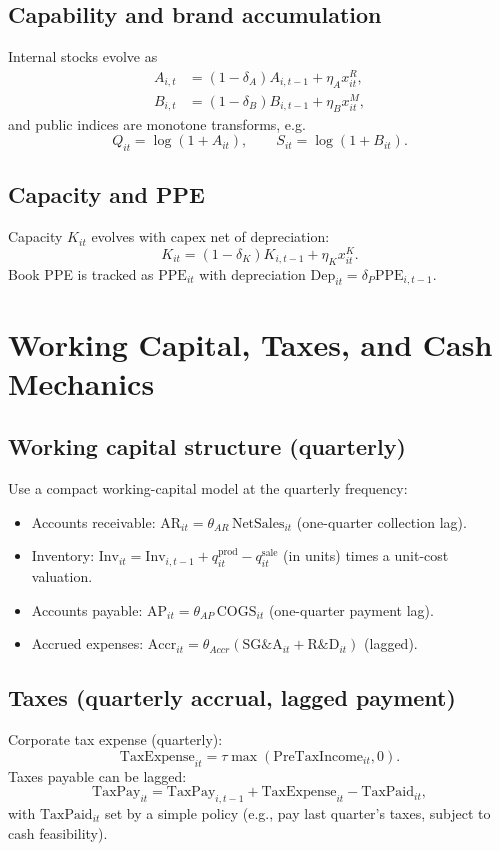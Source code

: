 \documentclass[11pt]{article}
\begin{document}
\subsection{Capability and brand accumulation}
Internal stocks evolve as
\begin{align}
A_{i,t} &= (1-\delta_A)A_{i,t-1} + \eta_A x^R_{it},\\
B_{i,t} &= (1-\delta_B)B_{i,t-1} + \eta_B x^M_{it},
\end{align}
and public indices are monotone transforms, e.g.
\[
Q_{it}=\log(1+A_{it}),\qquad S_{it}=\log(1+B_{it}).
\]

\subsection{Capacity and PPE}
Capacity $K_{it}$ evolves with capex net of depreciation:
\[
K_{it} = (1-\delta_K)K_{i,t-1} + \eta_K x^K_{it}.
\]
Book PPE is tracked as $\text{PPE}_{it}$ with depreciation $\text{Dep}_{it}=\delta_P \text{PPE}_{i,t-1}$.

\section{Working Capital, Taxes, and Cash Mechanics}

\subsection{Working capital structure (quarterly)}
Use a compact working-capital model at the quarterly frequency:
\begin{itemize}[leftmargin=*]
    \item Accounts receivable: $\text{AR}_{it} = \theta_{AR}\, \text{NetSales}_{it}$ (one-quarter collection lag).
    \item Inventory: $\text{Inv}_{it} = \text{Inv}_{i,t-1} + q^{\text{prod}}_{it} - q^{\text{sale}}_{it}$ (in units) times a unit-cost valuation.
    \item Accounts payable: $\text{AP}_{it} = \theta_{AP}\, \text{COGS}_{it}$ (one-quarter payment lag).
    \item Accrued expenses: $\text{Accr}_{it}=\theta_{Accr}(\text{SG\&A}_{it}+\text{R\&D}_{it})$ (lagged).
\end{itemize}

\subsection{Taxes (quarterly accrual, lagged payment)}
Corporate tax expense (quarterly):
\[
\text{TaxExpense}_{it}=\tau \max(\text{PreTaxIncome}_{it},0).
\]
Taxes payable can be lagged:
\[
\text{TaxPay}_{it} = \text{TaxPay}_{i,t-1} + \text{TaxExpense}_{it} - \text{TaxPaid}_{it},
\]
with $\text{TaxPaid}_{it}$ set by a simple policy (e.g., pay last quarter's taxes, subject to cash feasibility).
\end{document}
